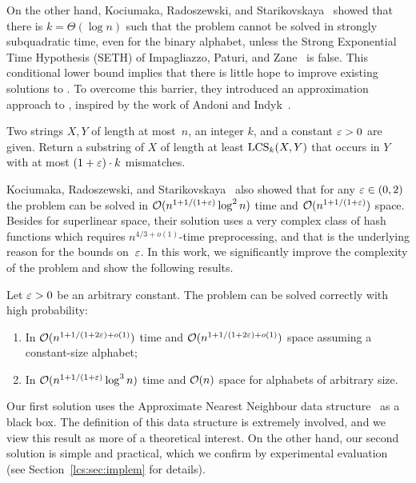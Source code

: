 On the other hand, Kociumaka, Radoszewski, and Starikovskaya~\cite{DBLP:journals/algorithmica/KociumakaRS19} showed that there is $k = \Theta(\log n)$ such that the \kLCS problem cannot be solved in strongly subquadratic time, even for the binary alphabet, unless the Strong Exponential Time Hypothesis (SETH) of Impagliazzo, Paturi, and Zane~\cite{DBLP:journals/jcss/ImpagliazzoPZ01} is false. This conditional lower bound implies that there is little hope to improve existing solutions to \kLCS. To overcome this barrier, they introduced an approximation approach to \kLCS, inspired by the work of Andoni and Indyk~\cite{substringNN}. 

\begin{problem}[\kApproxLCS]\label{pr:LCS'k}
Two strings $X, Y$ of length at most~$n$, an integer $k$, and a constant $\varepsilon > 0$ are given. Return a substring of $X$ of length at least $\mathrm{LCS}_{k}(X,Y)$ that occurs in $Y$ with at most $(1+\varepsilon) \cdot k$ mismatches.
\end{problem}

Kociumaka, Radoszewski, and Starikovskaya~\cite{DBLP:journals/algorithmica/KociumakaRS19} also showed that for any $\varepsilon \in (0,2)$ the \kApproxLCS problem can be solved in $\mathcal{O} (n^{1+1/(1+\varepsilon)} \log^2 n)$ time and $\mathcal{O} (n^{1+1/(1+\varepsilon)})$ space. Besides for superlinear space, their solution uses a very complex class of hash functions which requires $n^{4/3+o(1)}$-time preprocessing, and that is the underlying reason for the bounds on~$\varepsilon$. In this work, we significantly improve the complexity of the \kApproxLCS problem and show the following results.

\begin{theorem}\label{th:klcs_upper}
Let $\varepsilon > 0$ be an arbitrary constant. The \kApproxLCS problem can be solved correctly with high probability:
\begin{enumerate}[label=\arabic*)]
\item In $\mathcal{O}(n^{1+ 1/(1+2\varepsilon) + o(1)})$ time and $\mathcal{O}(n^{1+ 1/(1+2\varepsilon) + o(1)})$ space assuming a constant-size alphabet;
\item In $\mathcal{O}(n^{1+1/(1+\varepsilon)} \log^3 n)$ time and $\mathcal{O}(n)$ space for alphabets of arbitrary size. 
\end{enumerate}
\end{theorem}

Our first solution uses the Approximate Nearest Neighbour data structure~\cite{DBLP:conf/stoc/AndoniR15} as a black box. The definition of this data structure is extremely involved, and we view this result as more of a theoretical interest.
On the other hand, our second solution is simple and practical, which we confirm by experimental evaluation (see Section~\ref{lcs:sec:implem} for details). 

